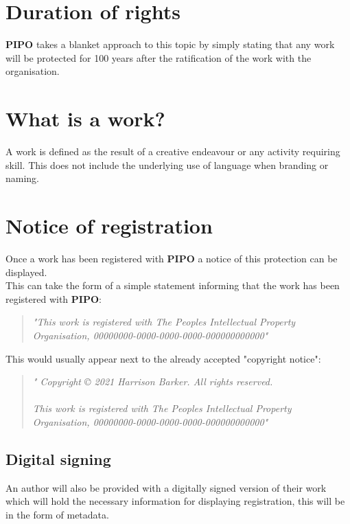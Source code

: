 \documentclass[12pt,draft]{article}
\begin{document}
\section{Duration of rights}
\textbf{PIPO} takes a blanket approach to this topic by simply stating that any work will be protected for 100 years after the ratification of the work with the organisation.

\section{What is a work?}
A work is defined as the result of a creative endeavour or any activity requiring skill. This does not include the underlying use of language when branding or naming.

\section{Notice of registration}
Once a work has been registered with \textbf{PIPO} a notice of this protection can be displayed.
\\
This can take the form of a simple statement informing that the work has been registered with \textbf{PIPO}:
\begin{quote}
\emph{"This work is registered with The Peoples Intellectual Property Organisation, 00000000-0000-0000-0000-000000000000"}
\end{quote}
This would usually appear next to the already accepted "copyright notice":
\begin{quote}
\emph{"
Copyright © 2021 Harrison Barker. All rights reserved.
\\\\
This work is registered with The Peoples Intellectual Property Organisation, 00000000-0000-0000-0000-000000000000"}
\end{quote}
\subsection{Digital signing}
An author will also be provided with a digitally signed version of their work which will hold the necessary information for displaying registration, this will be in the form of metadata.
\end{document}
